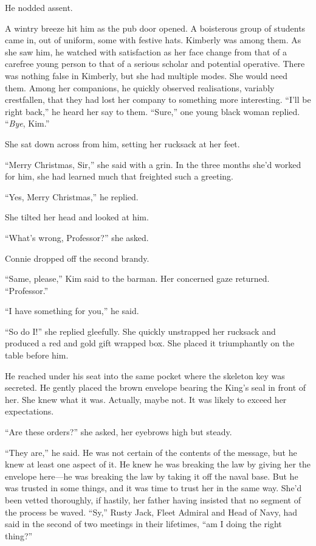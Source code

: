 \documentclass[11pt,a5paper]{article}
\begin{document}
He nodded assent.

A wintry breeze hit him as the pub door opened. A boisterous group of students came in, out of uniform, some with festive hats. Kimberly was among them. As she saw him, he watched with satisfaction as her face change from that of a carefree young person to that of a serious scholar and potential operative. There was nothing false in Kimberly, but she had multiple modes. She would need them. Among her companions, he quickly observed realisations, variably crestfallen, that they had lost her company to something more interesting. ``I'll be right back,'' he heard her say to them. ``Sure,'' one young black woman replied. ``\emph{Bye}, Kim.''

She sat down across from him, setting her rucksack at her feet.

``Merry Christmas, Sir,'' she said with a grin. In the three months she'd worked for him, she had learned much that freighted such a greeting.

``Yes, Merry Christmas,'' he replied.

She tilted her head and looked at him.

``What's wrong, Professor?'' she asked.

Connie dropped off the second brandy.

``Same, please,'' Kim said to the barman. Her concerned gaze returned. ``Professor.''

``I have something for you,'' he said.

``So do I!'' she replied gleefully. She quickly unstrapped her rucksack and produced a red and gold gift wrapped box. She placed it triumphantly on the table before him.

He reached under his seat into the same pocket where the skeleton key was secreted. He gently placed the brown envelope bearing the King's seal in front of her. She knew what it was. Actually, maybe not. It was likely to exceed her expectations.

``Are these orders?'' she asked, her eyebrows high but steady.

``They are,'' he said. He was not certain of the contents of the message, but he knew at least one aspect of it. He knew he was breaking the law by giving her the envelope here---he was breaking the law by taking it off the naval base. But he was trusted in some things, and it was time to trust her in the same way. She'd been vetted thoroughly, if hastily, her father having insisted that no segment of the process be waved. ``Sy,'' Rusty Jack, Fleet Admiral and Head of Navy, had said in the second of two meetings in their lifetimes, ``am I doing the right thing?''
\end{document}

